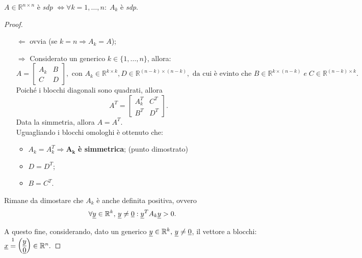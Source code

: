 \begin{theorem}\label{th:sottoMatrSDP}
    $A\in\mathbb R^{n\times n}$ è \textit{sdp} $\iff\forall k=1,\hdots, n:\; A_k$ è \textit{sdp}.
\end{theorem}
\begin{proof}
    \begin{itemize}
        \item[$\Leftarrow$] ovvia (se $k=n\Rightarrow A_k=A$);
        \item[$\Rightarrow$] Considerato un generico $k\in\{1,\hdots,n\}$, allora:
        \begin{equation*}
            A=\left[
            \begin{array}{c|c}
            A_k & B\\
            \hline
            C & D
        \end{array}\right],\text{ con } A_k\in\mathbb R^{k\times k}, D\in\mathbb R^{(n-k)\times (n-k)},\text{ da cui è evinto che } B\in\mathbb R^{k\times (n-k)}\; e\; C\in\mathbb R^{(n-k)\times k}.
        \end{equation*}
        Poiché i blocchi diagonali sono quadrati, allora
        \begin{equation*}
            A^T=\left[\begin{array}{c|c}
            A_k^T & C^T\\
            \hline
            B^T & D^T
        \end{array}\right].
        \end{equation*}
        Data la simmetria, allora $A=A^T$.\\
        Uguagliando i blocchi omologhi è ottenuto che:
        \begin{itemize}
            \item $A_k=A_k^T\boldsymbol{\Rightarrow A_k}$ \textbf{è simmetrica}; (punto dimostrato)
            \item $D=D^T$;
            \item $B=C^T$.
        \end{itemize}
    \end{itemize}
    
    Rimane da dimostare che $A_k$ è anche definita positiva, ovvero
    \begin{equation*}
        \forall\uline y\in\mathbb R^k,\,\uline y\neq \uline 0: \uline y^T A_k \uline y>0.
    \end{equation*}
    
    A questo fine, considerando, dato un generico $\uline y\in\mathbb R^k,\,\uline y\neq \uline 0$, il vettore a blocchi:
    $\uline x\overset{\footnotemark}{=}\begin{pmatrix}
            \uline y\\
            \uline 0
    \end{pmatrix}\in\mathbb R^n.$


\end{proof}
